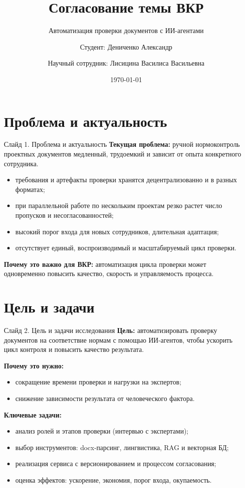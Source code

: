 \documentclass[aspectratio=169,12pt]{beamer}
\title[Согласование темы ВКР]{Согласование темы ВКР}
\subtitle{Автоматизация проверки документов с ИИ-агентами}
\author{Студент: Дениченко Александр}
\author{Научный сотрудник: Лисицина Василиса Васильевна}
\institute{Университет ИТМО}
\date{\today}
\begin{document}
\begin{frame}
  \titlepage
\end{frame}

\section{Проблема и актуальность}
\begin{frame}{Слайд 1. Проблема и актуальность}
\justifying
\textbf{Текущая проблема:} ручной нормоконтроль проектных документов медленный, трудоемкий и зависит от опыта конкретного сотрудника.
\vspace{0.6em}
\begin{itemize}
  \item требования и артефакты проверки хранятся децентрализованно и в разных форматах;
  \item при параллельной работе по нескольким проектам резко растет число пропусков и несогласованностей;
  \item высокий порог входа для новых сотрудников, длительная адаптация;
  \item отсутствует единый, воспроизводимый и масштабируемый цикл проверки.
\end{itemize}
\vspace{0.6em}
\textbf{Почему это важно для ВКР:} автоматизация цикла проверки может одновременно повысить качество, скорость и управляемость процесса.
\end{frame}

\section{Цель и задачи}
\begin{frame}{Слайд 2. Цель и задачи исследования}
\textbf{Цель:} автоматизировать проверку документов на соответствие нормам с помощью ИИ-агентов, чтобы ускорить цикл контроля и повысить качество результата.

\textbf{Почему это нужно:}
\begin{itemize}
  \item сокращение времени проверки и нагрузки на экспертов;
  \item снижение зависимости результата от человеческого фактора.
\end{itemize}

\textbf{Ключевые задачи:}
\begin{itemize}
  \item анализ ролей и этапов проверки (интервью с экспертами);
  \item выбор инструментов: docx-парсинг, лингвистика, RAG и векторная БД;
  \item реализация сервиса с версионированием и процессом согласования;
  \item оценка эффектов: ускорение, экономия, порог входа, окупаемость.
\end{itemize}
\end{frame}
\end{document}
